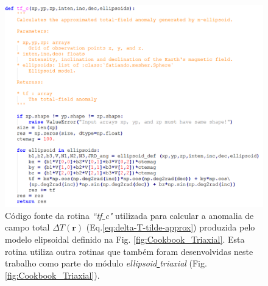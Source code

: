 \begin{figure}[hbt!]
	\centering \includegraphics[width=16 cm,height=14 cm]{figures/func_triaxial}
	\caption[Código fonte da rotina \textit{``tf\underline{ }c"} utilizada para calcular a anomalia de campo total $\Delta T (\mathbf{r})$ (Eq.\ref{eq:delta-T-tilde-approx}) produzida pelo modelo elipsoidal definido na Fig. \ref{fig:Cookbook_Triaxial}. Esta rotina utiliza outra rotinas que também foram desenvolvidas neste trabalho como parte do módulo \textit{ellipsoid\underline{ }triaxial} (Fig. \ref{fig:Cookbook_Triaxial}).]{Código fonte da rotina \textit{``tf\underline{ }c"} utilizada para calcular a anomalia de campo total $\Delta T (\mathbf{r})$ (Eq.\ref{eq:delta-T-tilde-approx}) produzida pelo modelo elipsoidal definido na Fig. \ref{fig:Cookbook_Triaxial}. Esta rotina utiliza outra rotinas que também foram desenvolvidas neste trabalho como parte do módulo \textit{ellipsoid\underline{ }triaxial} (Fig. \ref{fig:Cookbook_Triaxial}).}
	\label{fig:func_triaxial}
\end{figure}

